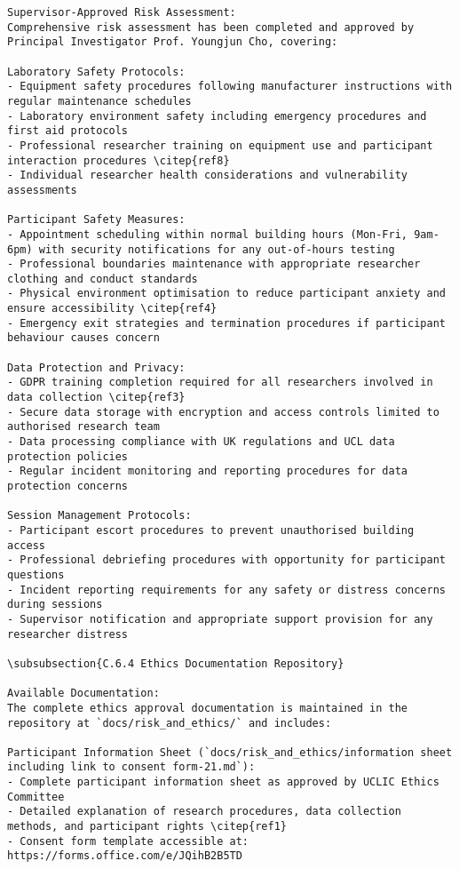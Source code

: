 \begin{verbatim}
Supervisor-Approved Risk Assessment:
Comprehensive risk assessment has been completed and approved by Principal Investigator Prof. Youngjun Cho, covering:

Laboratory Safety Protocols:
- Equipment safety procedures following manufacturer instructions with regular maintenance schedules
- Laboratory environment safety including emergency procedures and first aid protocols
- Professional researcher training on equipment use and participant interaction procedures \citep{ref8}
- Individual researcher health considerations and vulnerability assessments

Participant Safety Measures:
- Appointment scheduling within normal building hours (Mon-Fri, 9am-6pm) with security notifications for any out-of-hours testing
- Professional boundaries maintenance with appropriate researcher clothing and conduct standards
- Physical environment optimisation to reduce participant anxiety and ensure accessibility \citep{ref4}
- Emergency exit strategies and termination procedures if participant behaviour causes concern

Data Protection and Privacy:
- GDPR training completion required for all researchers involved in data collection \citep{ref3}
- Secure data storage with encryption and access controls limited to authorised research team
- Data processing compliance with UK regulations and UCL data protection policies
- Regular incident monitoring and reporting procedures for data protection concerns

Session Management Protocols:
- Participant escort procedures to prevent unauthorised building access
- Professional debriefing procedures with opportunity for participant questions
- Incident reporting requirements for any safety or distress concerns during sessions
- Supervisor notification and appropriate support provision for any researcher distress

\subsubsection{C.6.4 Ethics Documentation Repository}

Available Documentation:
The complete ethics approval documentation is maintained in the repository at `docs/risk_and_ethics/` and includes:

Participant Information Sheet (`docs/risk_and_ethics/information sheet including link to consent form-21.md`):
- Complete participant information sheet as approved by UCLIC Ethics Committee
- Detailed explanation of research procedures, data collection methods, and participant rights \citep{ref1}
- Consent form template accessible at: https://forms.office.com/e/JQihB2B5TD


\end{verbatim}
